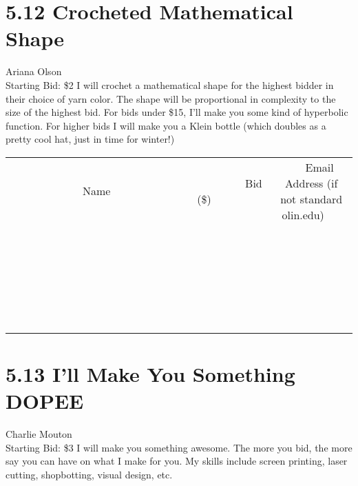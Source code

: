 \documentclass[11pt]{article}
\begin{document}
\section*{5.12 Crocheted Mathematical Shape}
Ariana Olson
\\
Starting Bid: \$2
\newline
I will crochet a mathematical shape for the highest bidder in their choice of yarn color. The shape will be proportional in complexity to the size of the highest bid. For bids under \$15, I'll make you some kind of hyperbolic function. For higher bids I will make you  a Klein bottle (which doubles as a pretty cool hat, just in time for winter!)
\\[6ex]
\begin{tabular}{c c c}
~~~~~~~~~~~~~Name~~~~~~~~~~~~~ & ~~~~~~~~~Bid (\$)~~~~~~~~~  & ~~~Email Address (if not standard olin.edu)~~~\\
 & & \\
\hline
 & & \\
\hline
 & & \\
\hline
 & & \\
\hline
 & & \\
\hline
 & & \\
\hline
 & & \\
\hline
 & & \\
\hline
 & & \\
\hline
 & & \\
\hline
 & & \\
\hline
 & & \\
\hline
 & & \\
\hline
 & & \\
\hline
 & & \\
\hline
 & & \\
\hline
 & & \\
\hline
 & & \\
\hline
 & & \\
\hline
 & & \\
\hline
 & & \\
\hline
 & & \\
\hline
 & & \\
\hline
 & & \\
\hline
 & & \\
\hline
 & & \\
\hline
\end{tabular}
\newpage
\section*{5.13 I'll Make You Something DOPEE}
Charlie Mouton
\\
Starting Bid: \$3
\newline
I will make you something awesome. The more you bid, the more say you can have on what I make for you. My skills include screen printing, laser cutting, shopbotting, visual design, etc.
\end{document}
